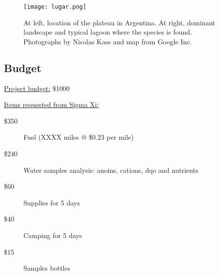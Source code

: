 \documentclass[11pt,a4paper,oneside]{article}
\begin{document}
\vfill
\begin{figure}[h] %
\centering
\texttt{[image: lugar.png]}
\caption{At left, location of the plateau in Argentina. At right, dominant landscape and typical lagoon where the species is found. Photographs by Nicolas Kass and map from Google Inc.}
\end{figure}
\vfill


% 
% 


\newpage

\subsection*{Budget}

\underline{Project budget:} \$1000

\bigskip

\noindent \underline{Items requested from Sigma Xi:}

\begin{description} %
	\item[\$350] Fuel (XXXX miles @ \$0.23 per mile)
	\item[\$240] Water samples analysis: anoins, cations, dqo and nutrients
	\item[\$60] Supplies for 5 days
	\item[\$40] Camping for 5 days
	\item[\$15] Samples bottles
\end{description}


\newpage
\end{document}
